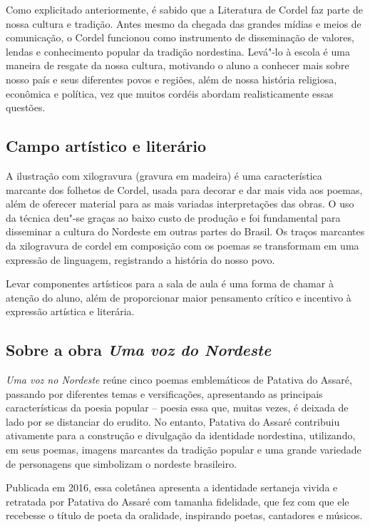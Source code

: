 \documentclass[12pt]{extarticle}
\begin{document}
Como explicitado anteriormente, é sabido que a Literatura de Cordel faz
parte de nossa cultura e tradição. Antes mesmo da chegada das grandes
mídias e meios de comunicação, o Cordel funcionou como instrumento de
disseminação de valores, lendas e conhecimento popular da tradição
nordestina. Levá"-lo à escola é uma maneira de resgate da nossa cultura,
motivando o aluno a conhecer mais sobre nosso país e seus diferentes
povos e regiões, além de nossa história religiosa, econômica e política,
vez que muitos cordéis abordam realisticamente essas questões.

\subsection{Campo artístico e literário}

A ilustração com xilogravura (gravura em madeira) é uma característica
marcante dos folhetos de Cordel, usada para decorar e dar mais vida aos
poemas, além de oferecer material para as mais variadas interpretações
das obras. O uso da técnica deu"-se graças ao baixo custo de produção e
foi fundamental para disseminar a cultura do Nordeste em outras partes
do Brasil. Os traços marcantes da xilogravura de cordel em composição
com os poemas se transformam em uma expressão de linguagem, registrando
a história do nosso povo.

Levar componentes artísticos para a sala de aula é uma forma de chamar à
atenção do aluno, além de proporcionar maior pensamento crítico e
incentivo à expressão artística e literária.

\subsection{Sobre a obra \textit{Uma voz do Nordeste}}

\emph{Uma voz no Nordeste} reúne cinco poemas emblemáticos de Patativa
do Assaré, passando por diferentes temas e versificações, apresentando
as principais características da poesia popular -- poesia essa que,
muitas vezes, é deixada de lado por se distanciar do erudito. No
entanto, Patativa do Assaré contribuiu ativamente para a construção e
divulgação da identidade nordestina, utilizando, em seus poemas, imagens
marcantes da tradição popular e uma grande variedade de personagens que
simbolizam o nordeste brasileiro.

Publicada em 2016, essa coletânea apresenta a identidade sertaneja
vivida e retratada por Patativa do Assaré com tamanha fidelidade, que
fez com que ele recebesse o título de poeta da oralidade, inspirando
poetas, cantadores e músicos.
\end{document}
